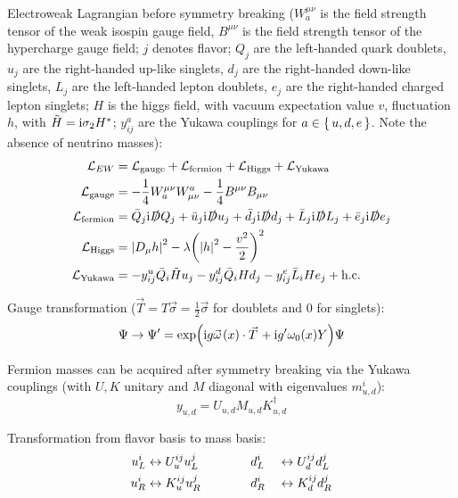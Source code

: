			Electroweak Lagrangian before symmetry breaking ($W_a^{\mu\nu}$ is the field strength tensor of the weak isospin gauge field, $B^{\mu\nu}$ is the field strength tensor of the hypercharge gauge field; $j$ denotes flavor; $Q_j$ are the left-handed quark doublets, $u_j$ are the right-handed up-like singlets, $d_j$ are the right-handed down-like singlets, $L_j$ are the left-handed lepton doublets, $e_j$ are the right-handed charged lepton singlets; $H$ is the higgs field, with vacuum expectation value $v$, fluctuation $h$, with $\tilde{H}=\mathrm{i}\sigma_2 H^{*}$; $y^a_{ij}$ are the Yukawa couplings for $a \in \set{u,d,e}$. Note the absence of neutrino masses):
			\begin{equation}
				\begin{aligned}
					\mathcal{L}_{EW} &= \mathcal{L}_{\text{gauge}} + \mathcal{L}_{\text{fermion}} + \mathcal{L}_{\text{Higgs}} + \mathcal{L}_{\text{Yukawa}} \\
					\mathcal{L}_{\text{gauge}} &= -\frac{1}{4} W_a^{\mu\nu} W^a_{\mu\nu} -\frac{1}{4} B^{\mu\nu} B_{\mu\nu} \\
					\mathcal{L}_{\text{fermion}} &= \bar{Q}_j \mathrm{i} \slashed{D} Q_j + \bar{u}_j \mathrm{i} \slashed{D} u_j + \bar{d}_j \mathrm{i} \slashed{D} d_j + \bar{L}_j \mathrm{i} \slashed{D} L_j + \bar{e}_j \mathrm{i} \slashed{D} e_j \\
					\mathcal{L}_{\text{Higgs}} &= \abs{D_\mu h}^2 - \lambda\qty(\abs{h}^2 -\frac{v^2}{2})^2 \\
					\mathcal{L}_{\text{Yukawa}} &= - y^u_{ij} \bar{Q}_{i} \tilde{H}  u_j - y^d_{ij} \bar{Q}_i H d_j - y^e_{ij} \bar{L}_i H e_j + \text{h.c.}
				\end{aligned}
			\end{equation}

			\noindent
			Gauge transformation ($\vec{T}=T\vec{\sigma}=\frac{1}{2}\vec{\sigma}$ for doublets and $0$ for singlets):
			\begin{equation}
				\Psi \to \Psi' = \exp(\i g \vec{\omega}(x)\cdot\vec{T}	+ \i g' \omega_0(x) Y) \Psi
			\end{equation}

			\noindent
			Fermion masses can be acquired after symmetry breaking via the Yukawa couplings (with $U,K$ unitary and $M$ diagonal with eigenvalues $m_{u,d}^i$):
			\begin{equation}
				y_{u,d} = U_{u,d} M_{u,d} K_{u,d}^\dagger
			\end{equation}

			\noindent
			Transformation from flavor basis to mass basis:
			\begin{alignat}{3}
				u_L^i &\leftrightarrow U^{ij}_u u_L^j
				\hspace{30pt} && d_L^i &&\leftrightarrow U^{ij}_d d_L^j
				\\
				u_R^i &\leftrightarrow K^{ij}_u u_R^j
				\hspace{30pt} && d_R^i &&\leftrightarrow K^{ij}_d d_R^j
			\end{alignat}

